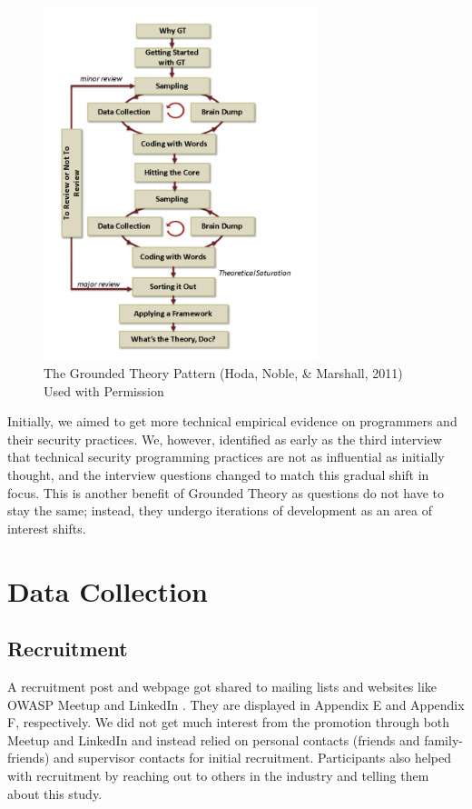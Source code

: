 \begin{figure}[ht]
\includegraphics[width=8cm]{figures/fig1.png}
\centering
\caption{The Grounded Theory Pattern (Hoda, Noble, \& Marshall, 2011) Used with Permission \cite{geeks}}
\centering
\end{figure}

\par Initially, we aimed to get more technical empirical evidence on programmers and their security practices. We, however, identified as early as the third interview that technical security programming practices are not as influential as initially thought, and the interview questions changed to match this gradual shift in focus. This is another benefit of Grounded Theory as questions do not have to stay the same; instead, they undergo iterations of development as an area of interest shifts.  


\section{Data Collection} 

\subsection{Recruitment}
\par A recruitment post and webpage got shared to mailing lists and websites like OWASP Meetup and LinkedIn \cite{webpage}. They are displayed in Appendix E and Appendix F, respectively. We did not get much interest from the promotion through both Meetup and LinkedIn and instead relied on personal contacts (friends and family-friends) and supervisor contacts for initial recruitment. Participants also helped with recruitment by reaching out to others in the industry and telling them about this study. 

